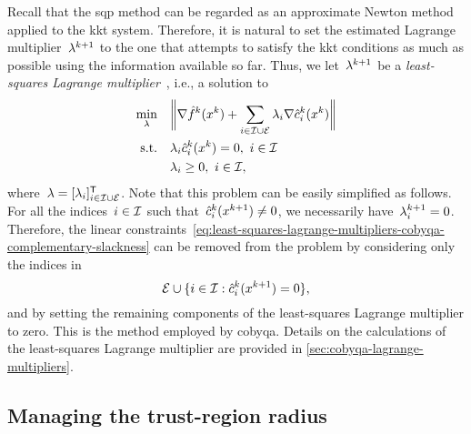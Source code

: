 Recall that the \gls{sqp} method can be regarded as an approximate Newton method applied to the \gls{kkt} system.
Therefore, it is natural to set the estimated Lagrange multiplier~$\lm[k + 1]$ to the one that attempts to satisfy the \gls{kkt} conditions as much as possible using the information available so far.
Thus, we let~$\lm[k + 1]$ be a \emph{least-squares Lagrange multiplier}~\cite[\S~3.3]{Dussault_1995}, i.e., a solution to
\begin{subequations}
    \label{eq:least-squares-lagrange-multipliers-cobyqa}
    \begin{align}
        \min_{\lm}  & \quad \norm[\bigg]{\nabla \objm[k](\iter[k]) + \sum_{i \in \iub \cup \ieq} \lm_i \nabla \conm[k]{i}(\iter[k])}\\
        \text{s.t.} & \quad \lm_i \conm[k]{i}(\iter[k]) = 0, ~ i \in \iub \label{eq:least-squares-lagrange-multipliers-cobyqa-complementary-slackness}\\
                    & \quad \lm_i \ge 0, ~ i \in \iub,
    \end{align}
\end{subequations}
where~$\lm = [\lm_i]_{i \in \iub \cup \ieq}^{\T}$.
Note that this problem can be easily simplified as follows.
For all the indices~$i \in \mathcal{I}$ such that~$\conm[k]{i}(\iter[k + 1]) \neq 0$, we necessarily have~$\lm[k + 1]_i = 0$.
Therefore, the linear constraints~\cref{eq:least-squares-lagrange-multipliers-cobyqa-complementary-slackness} can be removed from the problem by considering only the indices in
\begin{equation*}
    \ieq \cup \set{i \in \iub : \conm[k]{i}(\iter[k + 1]) = 0},
\end{equation*}
and by setting the remaining components of the least-squares Lagrange multiplier to zero.
This is the method employed by \gls{cobyqa}.
Details on the calculations of the least-squares Lagrange multiplier are provided in \cref{sec:cobyqa-lagrange-multipliers}.

\subsection{Managing the trust-region radius}
\label{subsec:managing-trust-region-radius}

